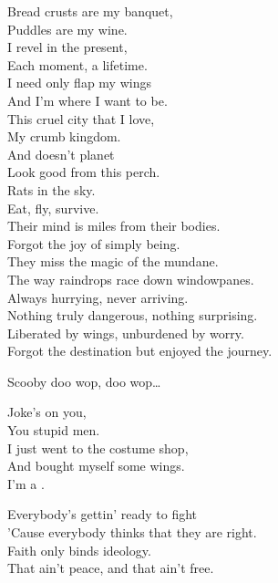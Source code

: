 
Bread crusts are my banquet, \\
Puddles are my wine. \\
I revel in the present, \\
Each moment, a lifetime. \\
I need only flap my wings \\
And I'm where I want to be. \\

This cruel city that I love, \\
My crumb kingdom. \\
And doesn't planet  \\
Look good from this perch. \\
Rats in the sky. \\
Eat, fly, survive. \\

Their mind is miles from their bodies. \\
Forgot the joy of simply being. \\
They miss the magic of the mundane. \\
The way raindrops race down windowpanes. \\
Always hurrying, never arriving. \\
Nothing truly dangerous, nothing surprising. \\
Liberated by wings, unburdened by worry. \\
Forgot the destination but enjoyed the journey. \\


Scooby doo wop, doo wop…

Joke's on you, \\
You stupid men. \\
I just went to the costume shop, \\
And bought myself some wings. \\
I'm a . \\




Everybody's gettin' ready to fight \\
'Cause everybody thinks that they are right. \\
Faith only binds ideology. \\
That ain't peace, and that ain't free. \\

